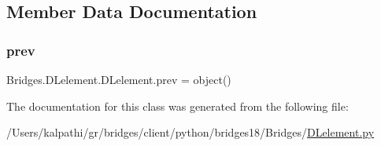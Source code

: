 \subsection{Member Data Documentation}
\mbox{\label{class_bridges_1_1_d_lelement_1_1_d_lelement_a08e7ba4d3ea7b49409b470752ca75ad1}} 
\subsubsection{\texorpdfstring{prev}{prev}}
{\footnotesize\ttfamily Bridges.\+D\+Lelement.\+D\+Lelement.\+prev = object()\hspace{0.3cm}{\ttfamily [static]}}



The documentation for this class was generated from the following file\+:\begin{DoxyCompactItemize}
\item 
/\+Users/kalpathi/gr/bridges/client/python/bridges18/\+Bridges/\mbox{\hyperlink{_d_lelement_8py}{D\+Lelement.\+py}}\end{DoxyCompactItemize}
